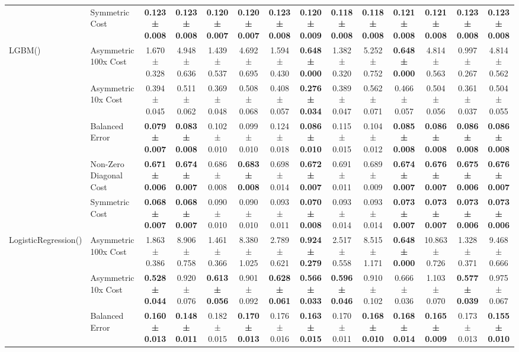 \begin{table}[H]
{\begin{tabular}{llcccccccccccc}
 & Symmetric Cost & \textbf{0.123 ± 0.008} & \textbf{0.123 ± 0.008} & \textbf{0.120 ± 0.007} & \textbf{0.120 ± 0.007} & \textbf{0.123 ± 0.008} & \textbf{0.120 ± 0.009} & \textbf{0.118 ± 0.008} & \textbf{0.118 ± 0.008} & \textbf{0.121 ± 0.008} & \textbf{0.121 ± 0.008} & \textbf{0.123 ± 0.008} & \textbf{0.123 ± 0.008} \\
\cline{1-14}
\multirow[t]{5}{*}{LGBM()} & Asymmetric 100x Cost & 1.670 ± 0.328 & 4.948 ± 0.636 & 1.439 ± 0.537 & 4.692 ± 0.695 & 1.594 ± 0.430 & \textbf{0.648 ± 0.000} & 1.382 ± 0.320 & 5.252 ± 0.752 & \textbf{0.648 ± 0.000} & 4.814 ± 0.563 & 0.997 ± 0.267 & 4.814 ± 0.562 \\
 & Asymmetric 10x Cost & 0.394 ± 0.045 & 0.511 ± 0.062 & 0.369 ± 0.048 & 0.508 ± 0.068 & 0.408 ± 0.057 & \textbf{0.276 ± 0.034} & 0.389 ± 0.047 & 0.562 ± 0.071 & 0.466 ± 0.057 & 0.504 ± 0.056 & 0.361 ± 0.037 & 0.504 ± 0.055 \\
 & Balanced Error & \textbf{0.079 ± 0.007} & \textbf{0.083 ± 0.008} & 0.102 ± 0.010 & 0.099 ± 0.010 & 0.124 ± 0.018 & \textbf{0.086 ± 0.010} & 0.115 ± 0.015 & 0.104 ± 0.012 & \textbf{0.085 ± 0.008} & \textbf{0.086 ± 0.008} & \textbf{0.086 ± 0.008} & \textbf{0.086 ± 0.008} \\
 & Non-Zero Diagonal Cost & \textbf{0.671 ± 0.006} & \textbf{0.674 ± 0.007} & 0.686 ± 0.008 & \textbf{0.683 ± 0.008} & 0.698 ± 0.014 & \textbf{0.672 ± 0.007} & 0.691 ± 0.011 & 0.689 ± 0.009 & \textbf{0.674 ± 0.007} & \textbf{0.676 ± 0.007} & \textbf{0.675 ± 0.006} & \textbf{0.676 ± 0.007} \\
 & Symmetric Cost & \textbf{0.068 ± 0.007} & \textbf{0.068 ± 0.007} & 0.090 ± 0.010 & 0.090 ± 0.010 & 0.093 ± 0.011 & \textbf{0.070 ± 0.008} & 0.093 ± 0.014 & 0.093 ± 0.014 & \textbf{0.073 ± 0.007} & \textbf{0.073 ± 0.007} & \textbf{0.073 ± 0.006} & \textbf{0.073 ± 0.006} \\
\cline{1-14}
\multirow[t]{5}{*}{LogisticRegression()} & Asymmetric 100x Cost & 1.863 ± 0.386 & 8.906 ± 0.758 & 1.461 ± 0.366 & 8.380 ± 1.025 & 2.789 ± 0.621 & \textbf{0.924 ± 0.279} & 2.517 ± 0.558 & 8.515 ± 1.171 & \textbf{0.648 ± 0.000} & 10.863 ± 0.726 & 1.328 ± 0.371 & 9.468 ± 0.666 \\
 & Asymmetric 10x Cost & \textbf{0.528 ± 0.044} & 0.920 ± 0.076 & \textbf{0.613 ± 0.056} & 0.901 ± 0.092 & \textbf{0.628 ± 0.061} & \textbf{0.566 ± 0.033} & \textbf{0.596 ± 0.046} & 0.910 ± 0.102 & 0.666 ± 0.036 & 1.103 ± 0.070 & \textbf{0.577 ± 0.039} & 0.975 ± 0.067 \\
 & Balanced Error & \textbf{0.160 ± 0.013} & \textbf{0.148 ± 0.011} & 0.182 ± 0.015 & \textbf{0.170 ± 0.013} & 0.176 ± 0.016 & \textbf{0.163 ± 0.015} & 0.170 ± 0.011 & \textbf{0.168 ± 0.010} & \textbf{0.168 ± 0.014} & \textbf{0.165 ± 0.009} & 0.173 ± 0.013 & \textbf{0.155 ± 0.010} \\

\end{tabular}}
\end{table}
